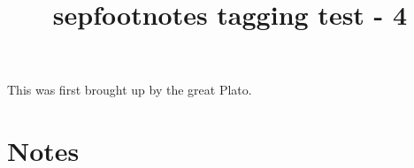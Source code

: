 \documentclass{article}
\title{sepfootnotes tagging test - 4}
\begin{document}
This was first brought up by the great Plato.
\section*{Notes}
\thexnotes
\end{document}

